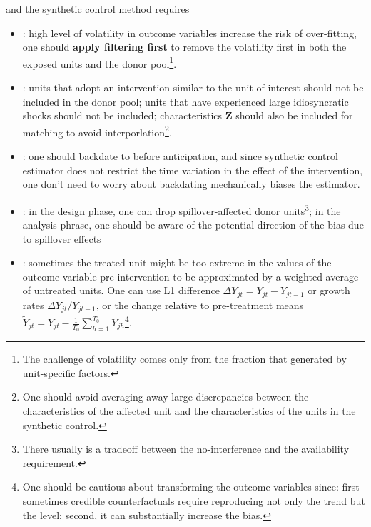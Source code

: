 \documentclass[twoside]{article}
\begin{document}
and the synthetic control method requires 
\begin{itemize}
    \item {}: high level of volatility in outcome variables increase the risk of over-fitting, one should \textbf{apply filtering first} to remove the volatility first in both the exposed units and the donor pool\footnote{The challenge of volatility comes only from the fraction that generated by unit-specific factors.}.
    \item {}: units that adopt an intervention similar to the unit of interest should not be included in the donor pool; units that have experienced large idiosyncratic shocks should not be included; characteristics $\mathbf{Z}$ should also be included for matching to avoid interporlation\footnote{One should avoid averaging away large discrepancies between the characteristics of the affected unit and the characteristics of the units in the synthetic control.}.
    \item {}: one should backdate to before anticipation, and since synthetic control estimator does not restrict the time variation in the effect of the intervention, one don't need to worry about backdating mechanically biases the estimator.
    \item {}: in the design phase, one can drop spillover-affected donor units\footnote{There usually is a tradeoff between the no-interference and the availability requirement.}; in the analysis phrase, one should be aware of the potential direction of the bias due to spillover effects
    \item {}: sometimes the treated unit might be too extreme in the values of the outcome variable pre-intervention to be approximated by a weighted average of untreated units. One can use L1 difference $\Delta Y_{jt} = Y_{jt}-Y_{jt-1}$ or growth rates $\Delta Y_{jt}/Y_{jt-1}$, or the change relative to pre-treatment means $\tilde{Y}_{jt} = Y_{jt} - \frac{1}{T_0}\sum^{T_0}_{h=1}Y_{jh}$\footnote{One should be cautious about transforming the outcome variables since: first sometimes credible counterfactuals require reproducing not only the trend but the level; second, it can substantially increase the bias.}.
\end{itemize}
\end{document}
